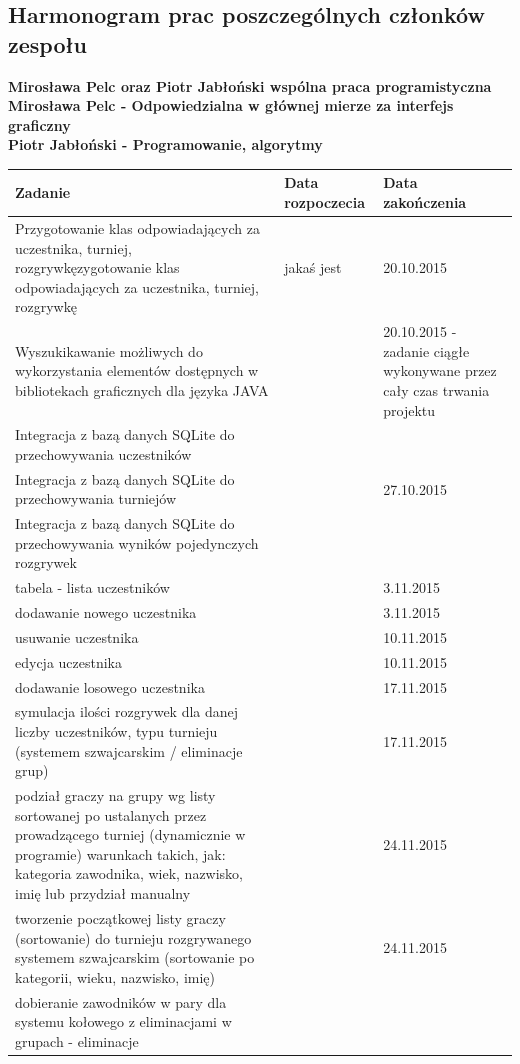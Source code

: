 \subsection{Harmonogram prac poszczególnych członków zespołu}
\textbf{Mirosława Pelc oraz Piotr Jabłoński wspólna praca programistyczna\\
Mirosława Pelc - Odpowiedzialna w głównej mierze za interfejs graficzny\\
Piotr Jabłoński - Programowanie, algorytmy\\}
\begin{tabular}{|p{9cm}|l|p{3cm}|} \hline
Zadanie & Data rozpoczecia & Data zakończenia\\ \hline
Przygotowanie klas odpowiadających za uczestnika, turniej, rozgrywkęzygotowanie klas odpowiadających za uczestnika, turniej, rozgrywkę & jakaś jest & 20.10.2015 \\ \hline
Wyszukikawanie możliwych do wykorzystania elementów dostępnych w bibliotekach graficznych dla języka JAVA& & 20.10.2015 - zadanie ciągłe wykonywane przez cały czas trwania projektu\\ \hline
Integracja z bazą danych SQLite do przechowywania uczestników&&\\
Integracja z bazą danych SQLite do przechowywania turniejów&&27.10.2015\\
Integracja z bazą danych SQLite do przechowywania wyników pojedynczych rozgrywek&&\\ \hline
tabela - lista uczestników&&3.11.2015\\ \hline
dodawanie nowego uczestnika&&3.11.2015\\ \hline
usuwanie uczestnika&&10.11.2015\\ \hline
edycja uczestnika&&10.11.2015\\ \hline
dodawanie losowego uczestnika&&17.11.2015\\ \hline
symulacja ilości rozgrywek dla danej liczby uczestników, typu turnieju (systemem szwajcarskim / eliminacje grup)&&17.11.2015\\ \hline
podział graczy na grupy wg listy sortowanej po ustalanych przez prowadzącego turniej (dynamicznie w programie) warunkach takich, jak: kategoria zawodnika, wiek, nazwisko, imię lub przydział manualny&&24.11.2015\\ \hline
tworzenie początkowej listy graczy (sortowanie) do turnieju rozgrywanego systemem szwajcarskim (sortowanie po kategorii, wieku, nazwisko, imię)&&24.11.2015\\ \hline
dobieranie zawodników w pary dla systemu kołowego z eliminacjami w grupach - eliminacje

\end{tabular}

